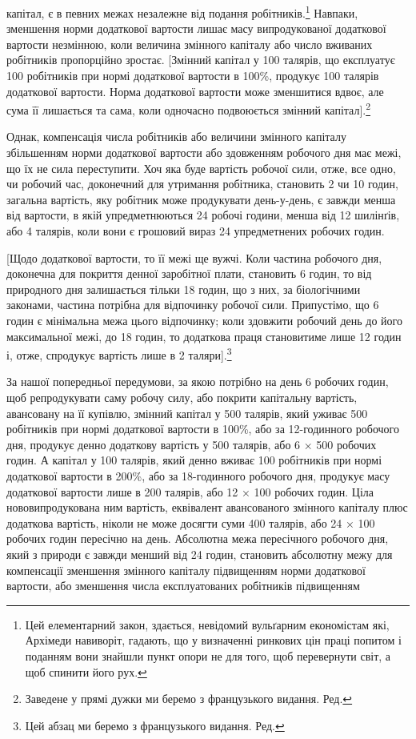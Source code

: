 капітал, є в певних межах незалежне від подання робітників.\footnote{
Цей елементарний закон, здається, невідомий вульґарним економістам
які, Архімеди навиворіт, гадають, що у визначенні ринкових цін
праці попитом і поданням вони знайшли пункт опори не для того, щоб
перевернути світ, а щоб спинити його рух.
}
Навпаки, зменшення норми додаткової вартости лишає масу
випродукованої додаткової вартости незмінною, коли величина
змінного капіталу або число вживаних робітників пропорційно
зростає. [Змінний капітал у 100 талярів, що експлуатує 100 робітників
при нормі додаткової вартости в 100\%, продукує 100 талярів
додаткової вартости. Норма додаткової вартости може зменшитися
вдвоє, але сума її лишається та сама, коли одночасно
подвоюється змінний капітал].\footnote*{
Заведене у прямі дужки ми беремо з французького видання. Ред.
}

Однак, компенсація числа робітників або величини змінного
капіталу збільшенням норми додаткової вартости або здовженням
робочого дня має межі, що їх не сила переступити. Хоч яка
буде вартість робочої сили, отже, все одно, чи робочий час,
доконечний для утримання робітника, становить 2 чи 10 годин,
загальна вартість, яку робітник може продукувати день-у-день,
є завжди менша від вартости, в якій упредметнюються 24 робочі
години, менша від 12 шилінґів, або 4 талярів, коли вони є грошовий
вираз 24 упредметнених робочих годин.

[Щодо додаткової вартости, то її межі ще вужчі. Коли частина
робочого дня, доконечна для покриття денної заробітної плати,
становить 6 годин, то від природного дня залишається тільки 18 годин,
що з них, за біологічними законами, частина потрібна для
відпочинку робочої сили. Припустімо, що 6 годин є мінімальна
межа цього відпочинку; коли здовжити робочий день до його максимальної
межі, до 18 годин, то додаткова праця становитиме
лише 12 годин і, отже, спродукує вартість лише в 2 таляри].\footnote*{
Цей абзац ми беремо з французького видання. Ред.
}

За нашої попередньої передумови, за якою потрібно на день
6 робочих годин, щоб репродукувати саму робочу силу, або
покрити капітальну вартість, авансовану на її купівлю, змінний
капітал у 500 талярів, який уживає 500 робітників при нормі
додаткової вартости в 100\%, або за 12-годинного робочого дня,
продукує денно додаткову вартість у 500 талярів, або 6 × 500
робочих годин. А капітал у 100 талярів, який денно вживає
100 робітників при нормі додаткової вартости в 200\%, або за 18-годинного
робочого дня, продукує масу додаткової вартости лише
в 200 талярів, або 12 × 100 робочих годин. Ціла нововипродукована
ним вартість, еквівалент авансованого змінного капіталу
плюс додаткова вартість, ніколи не може досягти суми 400 талярів,
або 24 × 100 робочих годин пересічно на день. Абсолютна
межа пересічного робочого дня, який з природи є завжди менший
від 24 годин, становить абсолютну межу для компенсації зменшення
змінного капіталу підвищенням норми додаткової вартости,
або зменшення числа експлуатованих робітників підвищенням